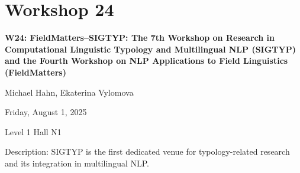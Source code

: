 \clearpage


\section[W24: FieldMatters–SIGTYP: The 7th Workshop on Research in Computational Linguistic Typology and Multilingual NLP (SIGTYP) and the Fourth Workshop on NLP Applications to Field Linguistics (FieldMatters)]{Workshop 24}
\label{workshop_24}

\begin{center}
    {\Large \textbf{W24: FieldMatters–SIGTYP: The 7th Workshop on Research in Computational Linguistic Typology and Multilingual NLP (SIGTYP) and the Fourth Workshop on NLP Applications to Field Linguistics (FieldMatters)}}

Michael Hahn, Ekaterina Vylomova

    Friday, August 1, 2025

 Level 1 Hall N1
    
\end{center}

Description: SIGTYP is the first dedicated venue for typology-related research and its integration in multilingual NLP.

